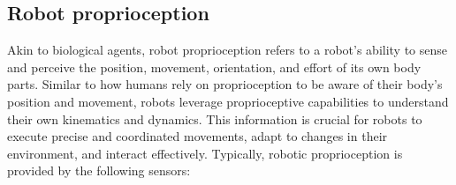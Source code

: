 \subsection{Robot proprioception}
Akin to biological agents, robot proprioception refers to a robot's ability to sense and perceive the position, movement, orientation, and effort of its own body parts. Similar to how humans rely on proprioception to be aware of their body's position and movement, robots leverage proprioceptive capabilities to understand their own kinematics and dynamics. This information is crucial for robots to execute precise and coordinated movements, adapt to changes in their environment, and interact effectively. Typically, robotic proprioception is provided by the following sensors\cite{Siegwart2011Introductionautonomousmobile}:
